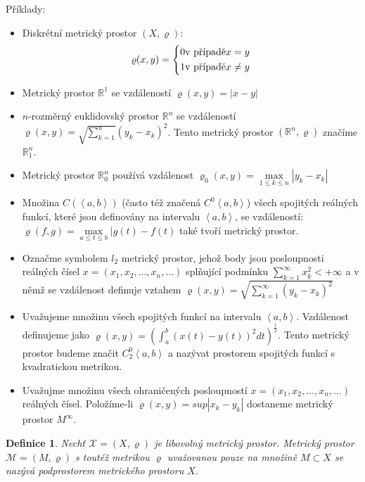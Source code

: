\documentclass[a4paper, 11pt]{report}
\newtheorem{mydef}{Definice}[chapter]
\begin{document}
Příklady:
\begin{itemize}
	\item Diskrétní metrický prostor $(X, \varrho)$:
	$$\varrho(x, y) = \begin{dcases}
	0 \text{v případě} x = y\\
	1 \text{v případě} x \not= y
	\end{dcases}$$
	\item Metrický prostor $\mathbb{R}^1$ se vzdáleností $\varrho(x, y) = |x-y|$
	\item $n$-rozměrný euklidovský prostor $\mathbb{R}^n$ se vzdáleností $\varrho(x, y) = \sqrt{\sum\limits_{k = 1}^n}(y_k - x_k)^2$. Tento metrický prostor $(\mathbb{R}^n, \varrho)$ značíme $\mathbb{R}^n_1$.
	\item Metrický prostor $\mathbb{R}^n_0$ používá vzdálenost $\varrho_0(x, y) = \max\limits_{1 \leq k \leq n} |y_k - x_k|$
	\item Množina $C(\left<a, b \right>)$ (často též značená $C^0\left<a,b\right>$) všech spojitých reálných funkcí, které jsou definovány na intervalu $\left<a, b\right>$, se vzdáleností: $\varrho(f, g) = \max\limits_{a \leq t \leq b} | g(t) - f(t)$ také tvoří metrický prostor.
	\item Označme symbolem $l_2$ metrický prostor, jehož body jsou posloupnosti reálných čísel
	$x = (x_1, x_2, \dots, x_n, \dots)$
	splňující podmínku
	$\sum\limits_{k=1}^\infty x_k^2 < +\infty$
	a v němž se vzdálenost definuje vztahem
	$\varrho(x, y) = \sqrt{\sum\limits_{k=1}^\infty(y_k - x_k)^2}$
	\item Uvažujeme množinu všech spojitých funkcí na intervalu $\left<a, b\right>$. Vzdálenost definujeme jako $\varrho(x, y) = \left( \int_a^b (x(t) - y(t))^2 dt \right)^\frac{1}{2}$. Tento metrický prostor budeme značit $C_2^0\left<a, b\right>$ a nazývat prostorem spojitých funkcí s kvadratickou metrikou.
	\item Uvažujme množinu všech ohraničených posloupností $x = (x_1, x_2, \dots, x_n, \dots)$ reálných čísel. Položíme-li $\varrho(x, y) = sup |x_k - y_k|$ dostaneme metrický prostor $M^\infty$.
\end{itemize}

\begin{mydef}
Nechť $\mathcal{X} = (X, \varrho)$ je libovolný metrický prostor. Metrický prostor $\mathcal{M} = (M, \varrho)$ s toutéž metrikou $\varrho$ uvažovanou pouze na množině $M \subset X$ se nazývá podprostorem metrického prostoru $X$.
\end{mydef}
\end{document}
